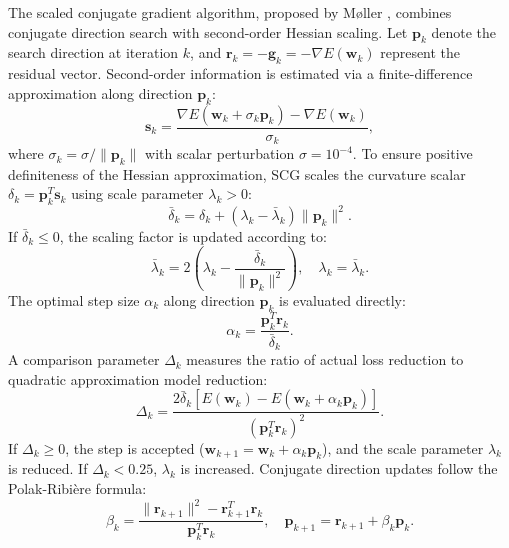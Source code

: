 \documentclass[10pt, conference]{IEEEtran}
\begin{document}
The scaled conjugate gradient algorithm, proposed by Møller \cite{moller1993scaled}, combines conjugate direction search with second-order Hessian scaling. Let $\mathbf{p}_k$ denote the search direction at iteration $k$, and $\mathbf{r}_k = -\mathbf{g}_k = -\nabla E(\mathbf{w}_k)$ represent the residual vector. Second-order information is estimated via a finite-difference approximation along direction $\mathbf{p}_k$:
\begin{equation}
\mathbf{s}_k = \frac{\nabla E(\mathbf{w}_k + \sigma_k \mathbf{p}_k) - \nabla E(\mathbf{w}_k)}{\sigma_k},
\end{equation}
where $\sigma_k = \sigma / \|\mathbf{p}_k\|$ with scalar perturbation $\sigma = 10^{-4}$. To ensure positive definiteness of the Hessian approximation, SCG scales the curvature scalar $\delta_k = \mathbf{p}_k^T \mathbf{s}_k$ using scale parameter $\lambda_k > 0$:
\begin{equation}
\bar{\delta}_k = \delta_k + (\lambda_k - \bar{\lambda}_k) \|\mathbf{p}_k\|^2.
\end{equation}
If $\bar{\delta}_k \le 0$, the scaling factor is updated according to:
\begin{equation}
\bar{\lambda}_k = 2 \left( \lambda_k - \frac{\bar{\delta}_k}{\|\mathbf{p}_k\|^2} \right), \quad \lambda_k = \bar{\lambda}_k.
\end{equation}
The optimal step size $\alpha_k$ along direction $\mathbf{p}_k$ is evaluated directly:
\begin{equation}
\alpha_k = \frac{\mathbf{p}_k^T \mathbf{r}_k}{\bar{\delta}_k}.
\end{equation}
A comparison parameter $\Delta_k$ measures the ratio of actual loss reduction to quadratic approximation model reduction:
\begin{equation}
\Delta_k = \frac{2 \bar{\delta}_k [E(\mathbf{w}_k) - E(\mathbf{w}_k + \alpha_k \mathbf{p}_k)]}{(\mathbf{p}_k^T \mathbf{r}_k)^2}.
\end{equation}
If $\Delta_k \ge 0$, the step is accepted ($\mathbf{w}_{k+1} = \mathbf{w}_k + \alpha_k \mathbf{p}_k$), and the scale parameter $\lambda_k$ is reduced. If $\Delta_k < 0.25$, $\lambda_k$ is increased. Conjugate direction updates follow the Polak-Ribière formula:
\begin{equation}
\beta_k = \frac{\|\mathbf{r}_{k+1}\|^2 - \mathbf{r}_{k+1}^T \mathbf{r}_k}{\mathbf{p}_k^T \mathbf{r}_k}, \quad \mathbf{p}_{k+1} = \mathbf{r}_{k+1} + \beta_k \mathbf{p}_k.
\end{equation}
\end{document}
